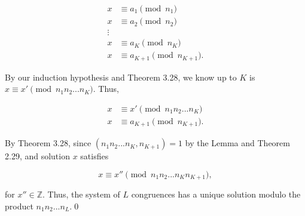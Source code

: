 \documentclass[12pt]{article}
\begin{document}
\begin{align*}
x &\equiv a_1\pmod {n_1} \\
x &\equiv a_2\pmod {n_2} \\
\vdots \\
x &\equiv a_K \pmod {n_K} \\
x &\equiv a_{K+1}\pmod {n_{K+1}}.
\end{align*}

\noindent By our induction hypothesis and Theorem 3.28, we know up to $K$ is \\
$x\equiv x' \pmod{n_1n_2...n_K}$. Thus,

\begin{align*}
x &\equiv x' \pmod{n_1n_2...n_K}\\
x &\equiv a_{K+1}\pmod {n_{K+1}}.
\end{align*}

\noindent   By Theorem 3.28, since $(n_1n_2...n_K,n_{K+1})=1$ by the Lemma and Theorem 2.29, and solution $x$ satisfies

\begin{equation*}
x \equiv x'' \pmod{n_1n_2...n_Kn_{K+1}},
\end{equation*}

\noindent for $x''\in\mathbb{Z}$. Thus, the system of $L$ congruences has a unique solution modulo the product $n_1n_2...n_L$.\qed
\end{document}
